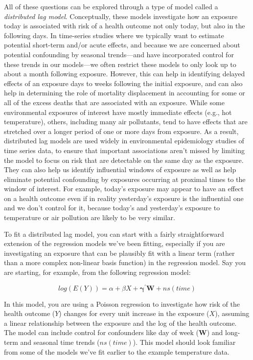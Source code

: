\documentclass[
]{book}
\begin{document}
All of these questions can be explored through a type of model called a
\emph{distributed lag model}. Conceptually, these models investigate how an exposure
today is associated with risk of a health outcome not only today, but also in
the following days. In time-series studies where we typically want to estimate
potential short-term and/or acute effects, and because we are concerned about potential
confounding by seasonal trends---and have incorporated control for these trends in
our models---we often restrict these models to only look up to about a month following
exposure. However, this can help in identifying delayed effects of an exposure days to weeks
following the initial exposure, and can also help in determining the role of
mortality displacement in accounting for some or all of the excess deaths that are
associated with an exposure. While some environmental exposures of interest
have mostly immediate effects (e.g., hot temperature), others, including many air
pollutants, tend to have effects that are stretched over a longer period of one or
more days from exposure. As a result, distributed lag models are used widely in
environmental epidemiology studies of time series data, to ensure that important
associations aren't missed by limiting the model to focus on risk that are
detectable on the same day as the exposure. They can also help us identify influential
windows of exposure as well as help eliminate potential confounding by exposures
occurring at proximal times to the window of interest. For example, today's exposure
may appear to have an effect on a health outcome even if in reality yesterday's
exposure is the influential one and we don't control for it, because today's and
yesterday's exposure to temperature or air pollution are likely to be very similar.

To fit a distributed lag model, you can start with a fairly straightforward
extension of the regression models we've been fitting, especially if you are
investigating an exposure that can be plausibly fit with a linear term (rather than
a more complex non-linear basis function) in the regression model. Say you are starting,
for example, from the following regression model:

\[
log(E(Y)) = \alpha + \beta X + \mathbf{\gamma^{'}W} + ns(time)
\]

In this model, you are using a Poisson regression to investigate how risk of the
health outcome (\(Y\)) changes for every unit increase in the exposure (\(X\)), assuming
a linear relationship between the exposure and the log of the health outcome. The model
can include control for confounders like day of week (\(\mathbf{W}\)) and long-term and
seasonal time trends (\(ns(time)\)). This model should look familiar from some of the
models we've fit earlier to the example temperature data.
\end{document}
